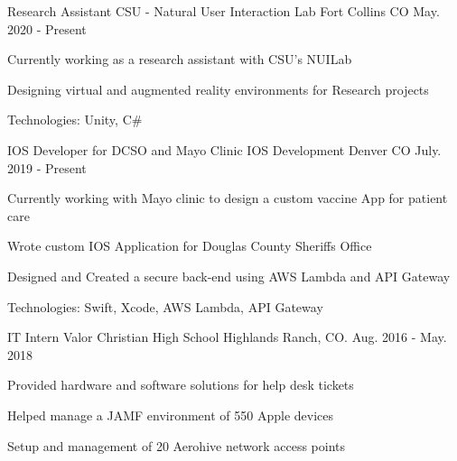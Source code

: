 \vspace{-2.0mm}

\begin{cventries}
\cventry
{Research Assistant} %
{CSU - Natural User Interaction Lab} %
{Fort Collins CO} %
{May. 2020 - Present} %
{
  \begin{cvitems} %
    \item {Currently working as a research assistant with CSU's NUILab}
    \item {Designing virtual and augmented reality environments for Research projects}
    \item {Technologies: Unity, C\#}
    \end{cvitems}
}
  \cventry
    {IOS Developer for DCSO and Mayo Clinic} %
    {IOS Development} %
    {Denver CO} %
    {July. 2019 - Present} %
    {
      \begin{cvitems} %
        \item {Currently working with Mayo clinic to design a custom vaccine App for patient care}
        \item {Wrote custom IOS Application for Douglas County Sheriffs Office}
        \item {Designed and Created a secure back-end using AWS Lambda and API Gateway}
        \item {Technologies: Swift, Xcode, AWS Lambda, API Gateway}
        \end{cvitems}
}
  \cventry
    {IT Intern} %
    {Valor Christian High School} %
    {Highlands Ranch, CO.} %
    {Aug. 2016 - May. 2018} %
    {
      \begin{cvitems} %
        \item {Provided hardware and software solutions for help desk tickets}
        \item {Helped manage a JAMF environment of 550 Apple devices}
        \item {Setup and management of 20 Aerohive network access points}
      \end{cvitems}
    }


\end{cventries}
